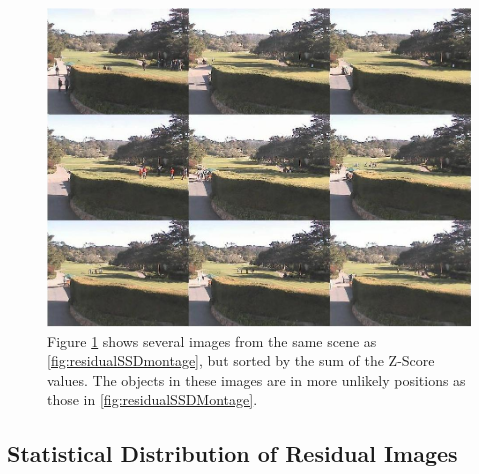 \begin{figure}
	\centering
		\includegraphics[width=1\textwidth]{figures/residualZScoreMontage.jpg}
	
	
		\caption[Z-Score Montage.]{Figure \ref{fig:residualZScoreMontage} shows several images from the same scene as \ref{fig:residualSSDmontage}, but sorted by the sum of the Z-Score values.  The objects in these images are in more unlikely positions as those in \ref{fig:residualSSDMontage}.}
		\label{fig:residualZScoreMontage}
\end{figure}





\subsection{Statistical Distribution of Residual Images}



